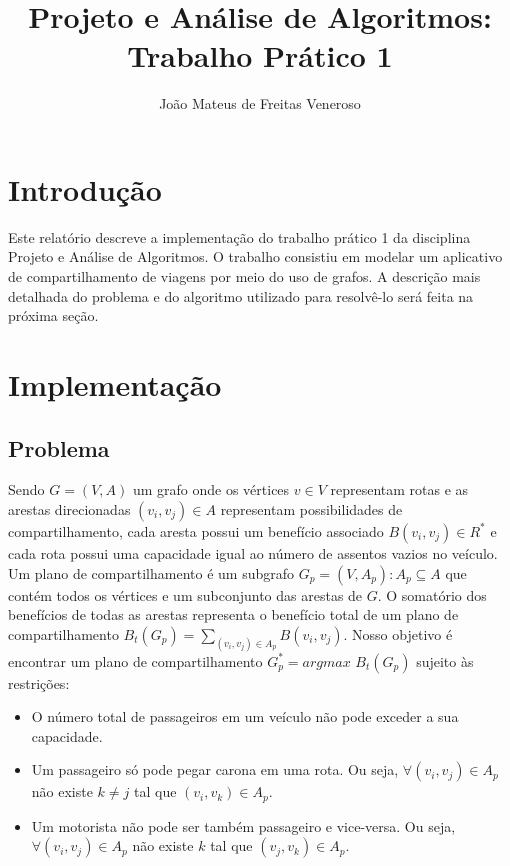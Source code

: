 \documentclass{report}
\begin{document}
\title{Projeto e Análise de Algoritmos: Trabalho Prático 1}
\author{João Mateus de Freitas Veneroso}

\maketitle

\tableofcontents

\chapter{Introdução}

Este relatório descreve a implementação do trabalho prático 1 da disciplina Projeto e Análise de Algoritmos. 
O trabalho consistiu em modelar um aplicativo de compartilhamento de viagens por meio do uso de grafos. A 
descrição mais detalhada do problema e do algoritmo utilizado para resolvê-lo será feita na próxima seção.

\chapter{Implementação}

\section{Problema} 

Sendo $ G = (V, A) $ um grafo onde os vértices $ v \in V $ representam rotas e as arestas direcionadas $ (v_i, v_j) \in A $ representam
possibilidades de compartilhamento, cada aresta possui um benefício associado $ B(v_i, v_j) \in R^* $ e cada rota possui uma capacidade
igual ao número de assentos vazios no veículo.
Um plano de compartilhamento é um subgrafo
$ G_p = (V, A_p) : A_p \subseteq A $ que contém todos os vértices e um subconjunto das arestas de $ G $. O somatório dos benefícios
de todas as arestas representa o benefício total de um plano de compartilhamento $ B_t(G_p) = \sum_{(v_i, v_j) \in A_p} B(v_i, v_j) $.
Nosso objetivo é encontrar um plano de compartilhamento $ G_p^* = argmax $ $ B_t(G_p) $ sujeito às restrições:

\begin{itemize}
\item O número total de passageiros em um veículo não pode exceder a sua capacidade.
\item Um passageiro só pode pegar carona em uma rota. Ou seja, $\forall (v_i, v_j) \in A_p $ não existe $ k \neq j $ tal que $ (v_i, v_k) \in A_p $.
\item Um motorista não pode ser também passageiro e vice-versa. Ou seja, $\forall (v_i, v_j) \in A_p $ não existe $ k $ tal que $ (v_j, v_k) \in A_p $.
\end{itemize}
\end{document}
